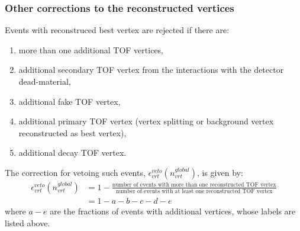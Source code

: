 \subsubsection{Other corrections to the reconstructed vertices}
Events with reconstruced best vertex are rejected if there  are:
\begin{enumerate}[label=\alph*)]
	\item more than one additional TOF vertices,
	\item additional secondary TOF vertex from the interactions with the detector dead-material,
	\item additional fake TOF vertex,
	\item additional primary TOF vertex (vertex splitting or background vertex reconstructed as best vertex),
	\item additional decay TOF vertex.  
\end{enumerate}
The correction for vetoing such events, $\epsilon_{vrt}^{veto}\left(n_{vrt}^{global}\right)$, is given by: 
\begin{equation}
\begin{split}
\epsilon_{vrt}^{veto}\left(n_{vrt}^{global}\right) & =1-\frac{\textrm{number of events with more than one reconstructed  TOF vertex}}{\textrm{number of events with at least one reconstructed TOF vertex}} \\
& =1-a-b-c-d-e
\end{split}
\end{equation}
where $a-e$ are the fractions of events with additional vertices, whose labels  are listed above.%

